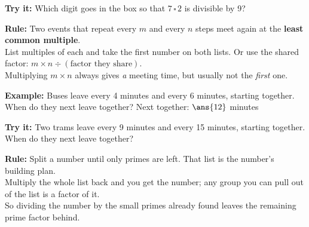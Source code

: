 \documentclass[12pt]{article}
\begin{document}
\begin{tryitbox}
\textbf{Try it:} \quad Which digit goes in the box so that $7\,\square\,2$ is divisible by 9?\\[2pt]
\end{tryitbox}


\begin{formulabox}
\textbf{Rule:} Two events that repeat every $m$ and every $n$ steps meet again at the \textbf{least common multiple}.\\[3pt]
List multiples of each and take the first number on both lists. Or use the shared factor: $m \times n \div (\text{factor they share})$.\\[3pt]
Multiplying $m \times n$ always gives \emph{a} meeting time, but usually not the \emph{first} one.
\end{formulabox}

\begin{examplebox}
\textbf{Example:} \quad Buses leave every 4 minutes and every 6 minutes, starting together. When do they next leave together?
Next together: $\ans{12}$ minutes
\end{examplebox}

\begin{tryitbox}
\textbf{Try it:} \quad Two trams leave every 9 minutes and every 15 minutes, starting together. When do they next leave together?\\[2pt]
\end{tryitbox}


\begin{formulabox}
\textbf{Rule:} Split a number until only primes are left. That list is the number's building plan.\\[3pt]
Multiply the whole list back and you get the number; any group you can pull out of the list is a factor of it.\\[3pt]
So dividing the number by the small primes already found leaves the remaining prime factor behind.
\end{formulabox}
\end{document}
